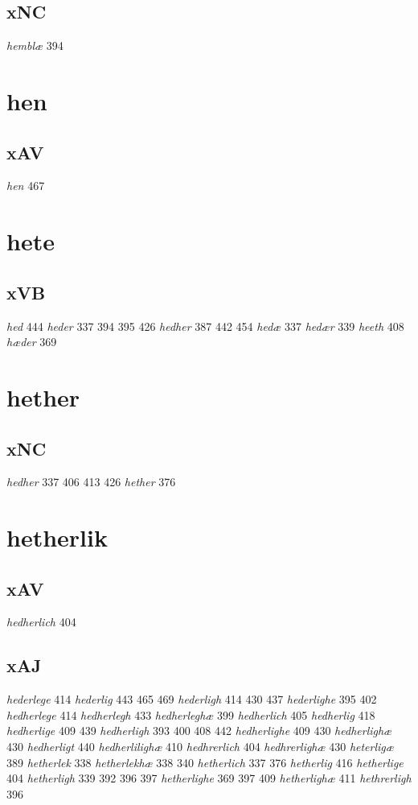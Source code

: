 \documentclass[a4paper,twocolumn]{article}
\begin{document}
\subsection{xNC}
\label{sec:org3fde6b1}
\emph{hemblæ} 394 
\section{hen}
\label{sec:org8116f14}
\subsection{xAV}
\label{sec:orgd4e6e18}
\emph{hen} 467 
\section{hete}
\label{sec:org0c27efd}
\subsection{xVB}
\label{sec:org00025e8}
\emph{hed} 444 \emph{heder} 337 394 395 426 \emph{hedher} 387 442 454 \emph{hedæ} 337 \emph{hedær} 339 \emph{heeth} 408 \emph{hæder} 369 
\section{hether}
\label{sec:org7f41b62}
\subsection{xNC}
\label{sec:org827a39d}
\emph{hedher} 337 406 413 426 \emph{hether} 376 
\section{hetherlik}
\label{sec:org6f5441c}
\subsection{xAV}
\label{sec:org7880b0a}
\emph{hedherlich} 404 
\subsection{xAJ}
\label{sec:orgc33a79c}
\emph{hederlege} 414 \emph{hederlig} 443 465 469 \emph{hederligh} 414 430 437 \emph{hederlighe} 395 402 \emph{hedherlege} 414 \emph{hedherlegh} 433 \emph{hedherleghæ} 399 \emph{hedherlich} 405 \emph{hedherlig} 418 \emph{hedherlige} 409 439 \emph{hedherligh} 393 400 408 442 \emph{hedherlighe} 409 430 \emph{hedherlighæ} 430 \emph{hedherligt} 440 \emph{hedherlilighæ} 410 \emph{hedhrerlich} 404 \emph{hedhrerlighæ} 430 \emph{heterligæ} 389 \emph{hetherlek} 338 \emph{hetherlekhæ} 338 340 \emph{hetherlich} 337 376 \emph{hetherlig} 416 \emph{hetherlige} 404 \emph{hetherligh} 339 392 396 397 \emph{hetherlighe} 369 397 409 \emph{hetherlighæ} 411 \emph{hethrerligh} 396 
\end{document}
